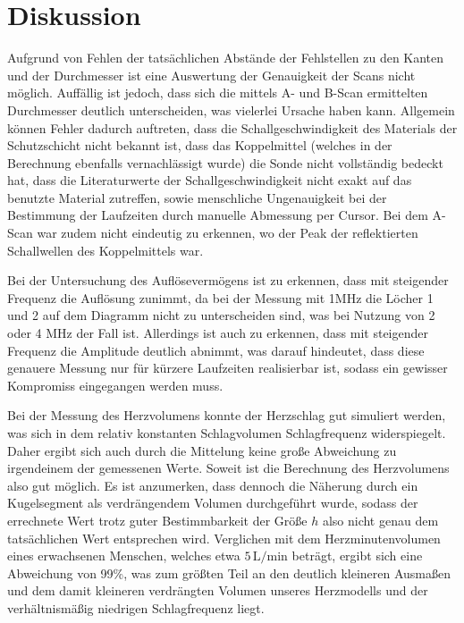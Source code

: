 \section{Diskussion}
\label{sec:Diskussion}

Aufgrund von Fehlen der tatsächlichen Abstände der Fehlstellen zu den Kanten und der Durchmesser
ist eine Auswertung der Genauigkeit der Scans nicht möglich. Auffällig ist jedoch, dass sich
die mittels A- und B-Scan ermittelten Durchmesser deutlich unterscheiden, was vielerlei
Ursache haben kann.
Allgemein können Fehler dadurch auftreten, dass die Schallgeschwindigkeit des
Materials der Schutzschicht nicht bekannt ist, dass das Koppelmittel (welches in der 
Berechnung ebenfalls vernachlässigt wurde) die Sonde nicht vollständig bedeckt hat, dass
die Literaturwerte der Schallgeschwindigkeit nicht exakt auf das benutzte Material zutreffen,
sowie menschliche Ungenauigkeit bei der Bestimmung der Laufzeiten durch manuelle Abmessung 
per Cursor.
Bei dem A-Scan war zudem nicht eindeutig zu erkennen, wo der Peak der reflektierten Schallwellen des Koppelmittels war.

Bei der Untersuchung des Auflösevermögens ist zu erkennen, dass mit steigender Frequenz die Auflösung zunimmt, da bei
der Messung mit 1MHz die Löcher 1 und 2 auf dem Diagramm nicht zu unterscheiden sind, was bei Nutzung von 2 oder 4
MHz der Fall ist. Allerdings ist auch zu erkennen, dass mit steigender Frequenz die Amplitude deutlich abnimmt, was
darauf hindeutet, dass diese genauere Messung nur für kürzere Laufzeiten realisierbar ist, sodass ein gewisser
Kompromiss eingegangen werden muss.

Bei der Messung des Herzvolumens konnte der Herzschlag gut simuliert werden, was sich in dem relativ konstanten Schlagvolumen
Schlagfrequenz widerspiegelt. Daher ergibt sich auch durch die Mittelung keine große Abweichung zu irgendeinem der gemessenen Werte. Soweit ist
die Berechnung des Herzvolumens also gut möglich. Es ist anzumerken, dass dennoch die Näherung durch ein Kugelsegment
als verdrängendem Volumen durchgeführt wurde, sodass der errechnete Wert trotz guter Bestimmbarkeit der Größe $h$ also
 nicht genau dem tatsächlichen Wert entsprechen wird. Verglichen mit dem Herzminutenvolumen eines
 erwachsenen Menschen, welches etwa $5\,\si{\liter\per\minute}$ beträgt\cite{kent4}, ergibt sich eine
 Abweichung von 99\%, was zum größten Teil an den deutlich kleineren Ausmaßen und dem damit kleineren verdrängten Volumen
 unseres Herzmodells und der verhältnismäßig niedrigen Schlagfrequenz liegt.